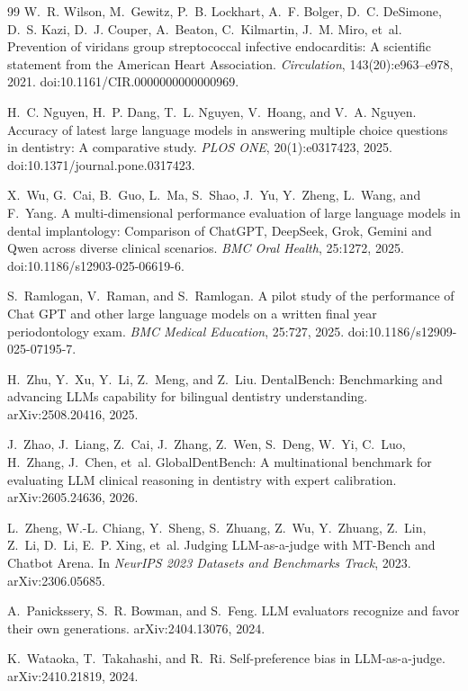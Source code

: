 \documentclass[11pt]{article}
\begin{document}
\begin{thebibliography}{99}
W.~R. Wilson, M.~Gewitz, P.~B. Lockhart, A.~F. Bolger, D.~C. DeSimone, D.~S. Kazi, D.~J. Couper, A.~Beaton, C.~Kilmartin, J.~M. Miro, et~al.
\newblock Prevention of viridans group streptococcal infective endocarditis: A scientific statement from the American Heart Association.
\newblock \emph{Circulation}, 143(20):e963--e978, 2021.
\newblock doi:10.1161/CIR.0000000000000969.

H.~C. Nguyen, H.~P. Dang, T.~L. Nguyen, V.~Hoang, and V.~A. Nguyen.
\newblock Accuracy of latest large language models in answering multiple choice questions in dentistry: A comparative study.
\newblock \emph{PLOS ONE}, 20(1):e0317423, 2025.
\newblock doi:10.1371/journal.pone.0317423.

X.~Wu, G.~Cai, B.~Guo, L.~Ma, S.~Shao, J.~Yu, Y.~Zheng, L.~Wang, and F.~Yang.
\newblock A multi-dimensional performance evaluation of large language models in dental implantology: Comparison of ChatGPT, DeepSeek, Grok, Gemini and Qwen across diverse clinical scenarios.
\newblock \emph{BMC Oral Health}, 25:1272, 2025.
\newblock doi:10.1186/s12903-025-06619-6.

S.~Ramlogan, V.~Raman, and S.~Ramlogan.
\newblock A pilot study of the performance of Chat GPT and other large language models on a written final year periodontology exam.
\newblock \emph{BMC Medical Education}, 25:727, 2025.
\newblock doi:10.1186/s12909-025-07195-7.

H.~Zhu, Y.~Xu, Y.~Li, Z.~Meng, and Z.~Liu.
\newblock DentalBench: Benchmarking and advancing LLMs capability for bilingual dentistry understanding.
\newblock arXiv:2508.20416, 2025.

J.~Zhao, J.~Liang, Z.~Cai, J.~Zhang, Z.~Wen, S.~Deng, W.~Yi, C.~Luo, H.~Zhang, J.~Chen, et~al.
\newblock GlobalDentBench: A multinational benchmark for evaluating LLM clinical reasoning in dentistry with expert calibration.
\newblock arXiv:2605.24636, 2026.

L.~Zheng, W.-L. Chiang, Y.~Sheng, S.~Zhuang, Z.~Wu, Y.~Zhuang, Z.~Lin, Z.~Li, D.~Li, E.~P. Xing, et~al.
\newblock Judging LLM-as-a-judge with MT-Bench and Chatbot Arena.
\newblock In \emph{NeurIPS 2023 Datasets and Benchmarks Track}, 2023.
\newblock arXiv:2306.05685.

A.~Panickssery, S.~R. Bowman, and S.~Feng.
\newblock LLM evaluators recognize and favor their own generations.
\newblock arXiv:2404.13076, 2024.

K.~Wataoka, T.~Takahashi, and R.~Ri.
\newblock Self-preference bias in LLM-as-a-judge.
\newblock arXiv:2410.21819, 2024.

\end{thebibliography}
\end{document}
